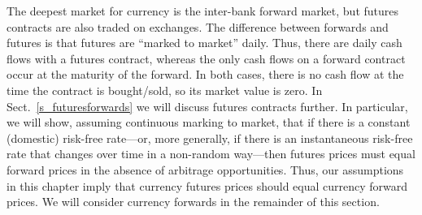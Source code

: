 The deepest market for currency is the inter-bank forward market, but futures contracts are also traded on exchanges.  The difference between forwards and futures is that futures are ``marked to market'' daily.    Thus, there are daily cash flows with a futures contract, whereas the only cash flows on a forward contract occur at the maturity of the forward.  In both cases, there is no cash flow at the time the contract is bought/sold, so its market value is zero.  In Sect.~\ref{s_futuresforwards} we will discuss futures contracts further.  In particular, we will show, assuming continuous marking to market, that if there is a constant (domestic) risk-free rate---or, more generally, if there is an instantaneous risk-free rate that changes over time in a non-random way---then futures prices must equal forward prices in the absence of arbitrage opportunities.  Thus, our assumptions in this chapter imply that currency futures prices should equal currency forward prices.  We will consider currency forwards in the remainder of this section.

